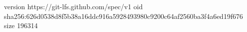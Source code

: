 version https://git-lfs.github.com/spec/v1
oid sha256:626d0538d8f5b38a16ddc916a5928493980c9200c64af2560ba3f4a6ed19f676
size 196314
